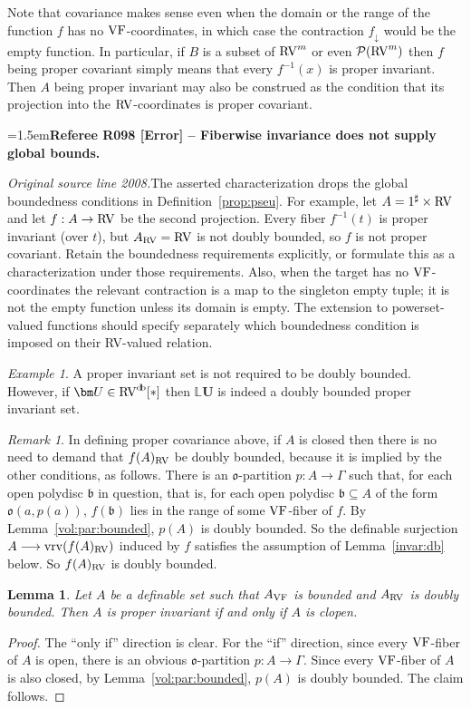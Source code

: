 \documentclass[12pt]{amsart}
\newcommand{\RefereeRemark}[4]{%
  \par\medskip\begingroup\normalfont\small\color{RefereePurple}%
  \emergencystretch=1.5em\noindent\textbf{Referee R#1 [#2] -- #3.}\par\nobreak\noindent #4\par
  \endgroup\medskip
}
\theoremstyle{plain}
\newtheorem{lem}[thm]{Lemma}
\theoremstyle{definition}
\theoremstyle{remark}
\newtheorem{rem}[thm]{Remark}
\newtheorem{exam}[thm]{Example}
\numberwithin{equation}{section}
\theoremstyle{plain}
\newcommand{\VF}{\textup{VF}}
\newcommand{\RV}{\textup{RV}}
\newcommand{\gb}{\mathfrak{b}}
\newcommand{\go}{\mathfrak{o}}
\newcommand{\0}{\emptyset}
\newcommand{\mdl}[1]{\mathcal{#1}}  %
\newcommand{\bb}[1]{\mathbb{#1}}
\newcommand{\fun}{\longrightarrow}
\newcommand{\sub}{\subseteq}
\DeclareMathOperator{\vrv}{vrv}
\DeclareMathOperator{\db}{d \! b}
\begin{document}
Note that covariance makes sense even when the domain or the range of the function $f$ has no $\VF$-coordinates, in which case the contraction $f_\downarrow$ would be the empty function. In particular, if $B$  is a subset of $\RV^m$ or even $\mdl P(\RV^m)$ then $f$ being proper covariant simply means that every $f^{-1}(x)$ is proper invariant. Then $A$ being proper invariant may also be construed as the condition that its projection into the $\RV$-coordinates is proper covariant.

\RefereeRemark{098}{Error}{Fiberwise invariance does not supply global bounds}{%
\textit{Original source line 2008.}\quad The asserted characterization drops the global boundedness conditions in Definition~\ref{prop:pseu}. For example, let $A=1^\sharp\times\RV$ and let $f:A\to\RV$ be the second projection. Every fiber $f^{-1}(t)$ is proper invariant (over $t$), but $A_{\RV}=\RV$ is not doubly bounded, so $f$ is not proper covariant. Retain the boundedness requirements explicitly, or formulate this as a characterization under those requirements. Also, when the target has no $\VF$-coordinates the relevant contraction is a map to the singleton empty tuple; it is not the empty function unless its domain is empty. The extension to powerset-valued functions should specify separately which boundedness condition is imposed on their RV-valued relation.
}

\begin{exam}
A proper invariant set  is not required to be doubly bounded. However, if $\bm U \in \RV^{\db}[*]$ then $\bb L \bm U$ is indeed a doubly bounded proper invariant set.
\end{exam}

\begin{rem}
In defining proper covariance above, if  $A$ is closed then  there is no need to demand that $f(A)_{\RV}$ be doubly bounded, because it is implied by the other conditions, as follows. There is an $\go$-partition $p: A \fun \Gamma$ such that, for each open polydisc $\gb$ in question, that is, for each open polydisc $\gb \sub A$ of the form $\go(a, p(a))$, $f(\gb)$ lies in the range of some $\VF$-fiber of $f$. By Lemma~\ref{vol:par:bounded}, $p(A)$ is doubly bounded. So the definable surjection $A \fun \vrv(f(A)_{\RV})$ induced by $f$ satisfies the assumption of Lemma~\ref{invar:db} below. So  $f(A)_{\RV}$ is doubly bounded.
\end{rem}

\begin{lem}\label{inv:crit}
Let $A$ be a definable set such that $A_{\VF}$ is bounded and $A_{\RV}$ is doubly bounded. Then $A$ is proper invariant if and only if $A$ is clopen.
\end{lem}
\begin{proof}
The ``only if'' direction is clear. For the ``if'' direction, since every $\VF$-fiber of $A$ is open, there is an obvious  $\go$-partition $p: A \fun \Gamma$. Since every $\VF$-fiber of $A$ is also closed, by Lemma~\ref{vol:par:bounded}, $p(A)$ is doubly bounded. The claim follows.
\end{proof}
\end{document}
